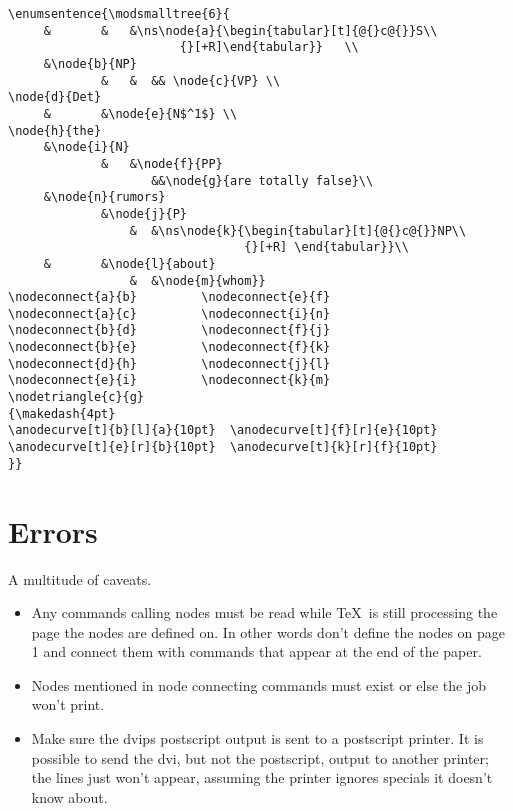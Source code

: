 \begin{verbatim}
\enumsentence{\modsmalltree{6}{
     &       &   &\ns\node{a}{\begin{tabular}[t]{@{}c@{}}S\\ 
                        {}[+R]\end{tabular}}   \\
     &\node{b}{NP} 
             &   &  && \node{c}{VP} \\
\node{d}{Det}
     &       &\node{e}{N$^1$} \\
\node{h}{the}
     &\node{i}{N}  
             &   &\node{f}{PP} 
                    &&\node{g}{are totally false}\\
     &\node{n}{rumors}
             &\node{j}{P} 
                 &  &\ns\node{k}{\begin{tabular}[t]{@{}c@{}}NP\\
                                 {}[+R] \end{tabular}}\\
     &       &\node{l}{about} 
                 &  &\node{m}{whom}}
\nodeconnect{a}{b}         \nodeconnect{e}{f}
\nodeconnect{a}{c}         \nodeconnect{i}{n}
\nodeconnect{b}{d}         \nodeconnect{f}{j}
\nodeconnect{b}{e}         \nodeconnect{f}{k}
\nodeconnect{d}{h}         \nodeconnect{j}{l}
\nodeconnect{e}{i}         \nodeconnect{k}{m}
\nodetriangle{c}{g}
{\makedash{4pt}
\anodecurve[t]{b}[l]{a}{10pt}  \anodecurve[t]{f}[r]{e}{10pt}
\anodecurve[t]{e}[r]{b}{10pt}  \anodecurve[t]{k}[r]{f}{10pt}
}}
\end{verbatim}


\section{Errors}

A multitude of caveats.
\begin{itemize}
  \item Any commands calling nodes must be read while \TeX\ is still
processing the page the nodes are defined on. In other words don't
define the nodes on page 1 and connect them with commands that appear
at the end of the paper.

\item Nodes mentioned in node connecting commands must exist or else
      the job won't print.  

\item Make sure the dvips postscript output is sent to a postscript
printer.  It is possible to send the dvi, but not the postscript,
output to another printer; the lines just won't appear, assuming the
printer ignores specials it doesn't know about.


\end{itemize}





